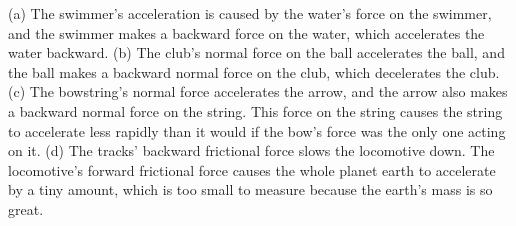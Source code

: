 (a) The swimmer's acceleration is caused by the water's
force on the swimmer, and the swimmer makes a backward force
on the water, which accelerates the water backward. (b) The
club's normal force on the ball accelerates the ball, and
the ball makes a backward normal force on the club, which
decelerates the club. (c) The bowstring's normal force
accelerates the arrow, and the arrow also makes a backward
normal force on the string. This force on the string causes
the string to accelerate less rapidly than it would if the
bow's force was the only one acting on it. (d) The tracks'
backward frictional force slows the locomotive down. The
locomotive's forward frictional force causes the whole
planet earth to accelerate by a tiny amount, which is too
small to measure because the earth's mass is so great.



